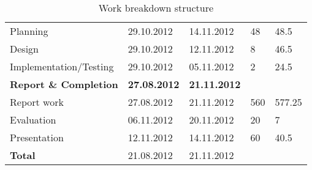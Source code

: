 \begin{table}
\begin{center}
\begin{tabular}{ l|l|l|l|l }
Planning & 29.10.2012 & 14.11.2012 & 48 & 48.5\\
Design & 29.10.2012 & 12.11.2012 & 8 & 46.5 \\
Implementation/Testing & 29.10.2012 & 05.11.2012 & 2 & 24.5\\ \hline
\textbf{Report \& Completion} & \bf{27.08.2012} & \bf{21.11.2012} & \bf{} & \bf{}\\ \hline
Report work & 27.08.2012 & 21.11.2012 & 560 & 577.25\\
Evaluation & 06.11.2012 & 20.11.2012 & 20 & 7\\
Presentation &12.11.2012 & 14.11.2012 & 60 & 40.5\\ \hline
\bf{Total} & 21.08.2012 & 21.11.2012 & \bf{}	& \bf{} \\ \hline
\end{tabular}
\caption{Work breakdown structure} \label{table:wbs}
\end{center}
\end{table}
